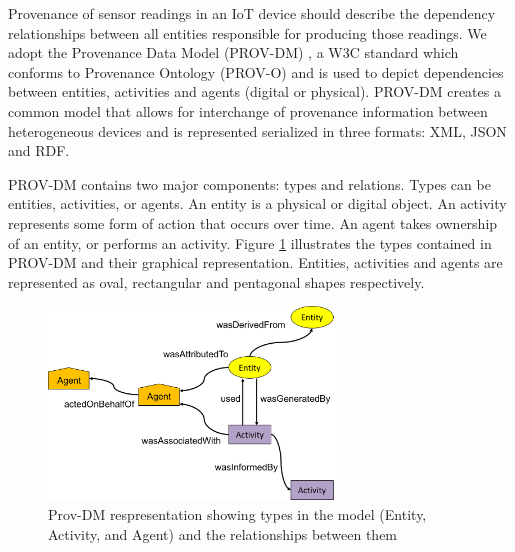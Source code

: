 \documentclass[conference]{IEEEtran}
\begin{document}

Provenance of sensor readings in an IoT device should describe the dependency relationships between all entities responsible for producing those readings. We adopt the Provenance Data Model (PROV-DM) \cite{prov_dm}, a W3C standard which conforms to Provenance Ontology (PROV-O) and is used to depict dependencies between entities, activities and agents (digital or physical). PROV-DM creates a common model that allows for interchange of provenance information between heterogeneous devices and is represented serialized in three formats:  XML, JSON and RDF. 

\par PROV-DM contains two major components: types and relations.  Types can be entities, activities, or agents. An entity is a physical or digital object. An activity represents some form of action that occurs over time.  An agent takes ownership of an entity, or performs an activity. Figure \ref{prov_rep} illustrates the types contained in PROV-DM and their graphical representation. Entities, activities and agents are represented as oval, rectangular and pentagonal shapes respectively. 





\begin{figure}[h!]
\begin{center}

\includegraphics[width=3.0in]{prov_dm_2.PNG}
\end{center}
\caption{Prov-DM respresentation showing types in the model (Entity, Activity, and Agent) and the relationships between them }
\label{prov_rep}
\end{figure}
\end{document}

